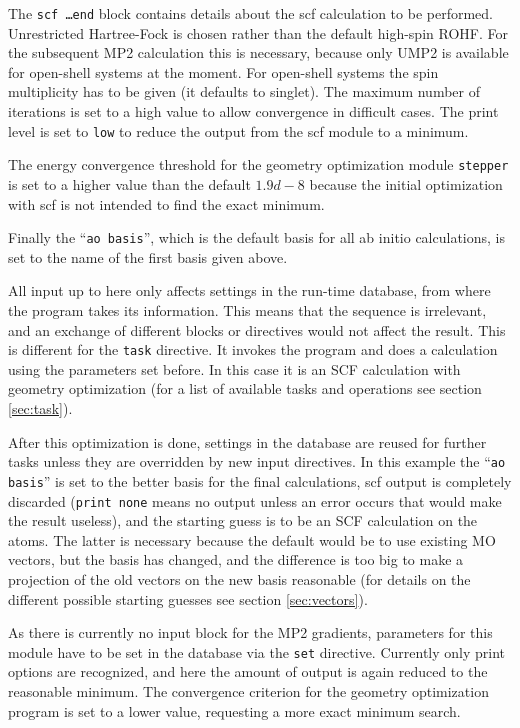 The {\tt scf \ldots end} block contains details about the scf
calculation to be performed. Unrestricted Hartree-Fock is chosen
rather than the default high-spin ROHF. For the subsequent MP2
calculation this is necessary, because only UMP2 is available for
open-shell systems at the moment. For open-shell systems the spin
multiplicity has to be given (it defaults to singlet). The maximum
number of iterations is set to a high value to allow convergence in
difficult cases. The print level is set to {\tt low} to reduce the
output from the scf module to a minimum.

The energy convergence threshold for the geometry optimization module
{\tt stepper} is set to a higher value than the default $1.9d-8$
because the initial optimization with scf is not intended to find the
exact minimum.

Finally the ``{\tt ao basis}'', which is the default basis for all ab
initio calculations, is set to the name of the first basis given
above.

All input up to here only affects settings in the run-time database,
from where the program takes its information. This means that the
sequence is irrelevant, and an exchange of different blocks or
directives would not affect the result. This is different for the 
{\tt task} directive. It invokes the program and does a calculation
using the parameters set before. In this case it is an SCF calculation
with geometry optimization (for a list of available tasks and
operations see section \ref{sec:task}).

After this optimization is done, settings in the database are reused
for further tasks unless they are overridden by new input directives.
In this example the ``{\tt ao basis}'' is set to the better basis for
the final calculations, scf output is completely discarded ({\tt print
  none} means no output unless an error occurs that would make the
result useless), and the starting guess is to be an SCF calculation on
the atoms. The latter is necessary because the default would be to use
existing MO vectors, but the basis has changed, and the difference is
too big to make a projection of the old vectors on the new basis
reasonable (for details on the different possible starting guesses see
section \ref{sec:vectors}).

As there is currently no input block for the MP2 gradients, parameters
for this module have to be set in the database via the {\tt set}
directive. Currently only print options are recognized, and here the
amount of output is again reduced to the reasonable minimum. The
convergence criterion for the geometry optimization program is set to
a lower value, requesting a more exact minimum search.

